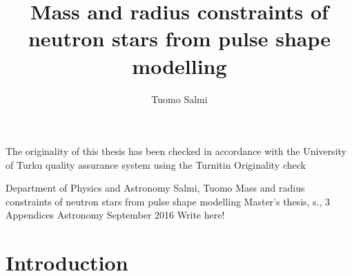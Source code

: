 \documentclass{wihuri}
\begin{document}


\title{Mass and radius constraints of neutron stars
from pulse shape modelling}
\author{Tuomo Salmi}

\maketitle
\newpage
\thispagestyle{empty}
\vspace*{10cm}

\vfill

  
\hspace*{-2cm}\parbox{\textwidth}{The originality of this thesis has been checked in accordance with the University of Turku quality assurance system using the Turnitin Originality check}
  


\newpage


\begin{tiivistelma}%
        {Department of Physics and Astronomy}%
        {Salmi, Tuomo}%
        {Mass and radius constraints of neutron stars
from pulse shape modelling}
        {Master's thesis, \pageref{LastPage} s., 3 Appendices}%
        {Astronomy}%
        {September 2016}%
	Write here!
\end{tiivistelma}




\tableofcontents %
\newpage
\section*{Introduction}
\end{document}
